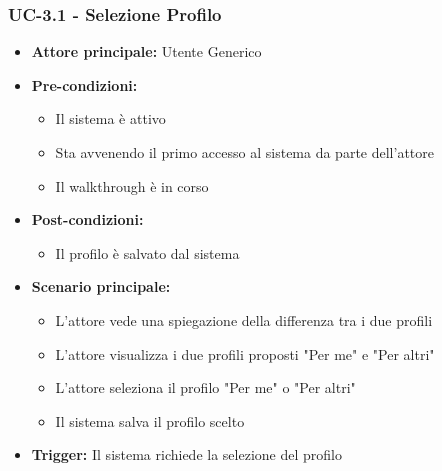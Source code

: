\documentclass[a4paper,12pt]{article}
\begin{document}
\subsubsection{UC-3.1 - Selezione Profilo} \label{subsec:UC-3.1}
\begin{itemize}
    \item \textbf{Attore principale:} Utente Generico
    \item \textbf{Pre-condizioni:}
    \begin{itemize}
        \item Il sistema è attivo
        \item Sta avvenendo il primo accesso al sistema da parte dell'attore
        \item Il walkthrough è in corso
    \end{itemize}
    \item \textbf{Post-condizioni:}
    \begin{itemize}
        \item Il profilo è salvato dal sistema
    \end{itemize}
    \item \textbf{Scenario principale:}
    \begin{itemize}
        \item L'attore vede una spiegazione della differenza tra i due profili
        \item L'attore visualizza i due profili proposti "Per me" e "Per altri"
        \item L'attore seleziona il profilo "Per me" o "Per altri"
        \item Il sistema salva il profilo scelto
    \end{itemize}
    \item \textbf{Trigger:} Il sistema richiede la selezione del profilo
\end{itemize}
\end{document}
